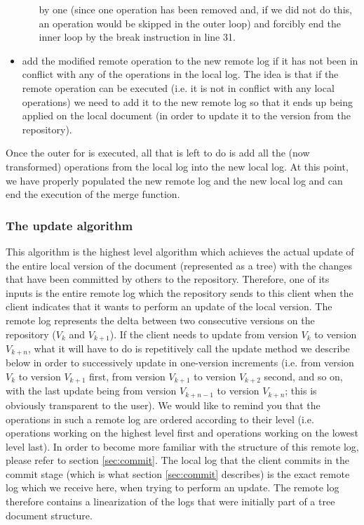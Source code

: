\begin{itemize}
\begin{enumerate}
      by one (since one operation has been removed and, if we did not do this, an operation would be
      skipped in the outer loop) and forcibly end the inner loop by the break instruction in line 31.
\end{enumerate}
\item add the modified remote operation to the new remote log if it has not been in conflict with any of
      the operations in the local log. The idea is that if the remote operation can be executed (i.e.
      it is not in conflict with any local operations) we need to add it to the new remote log so that
      it ends up being applied on the local document (in order to update it to the version from the
      repository).
\end{itemize}

Once the outer for is executed, all that is left to do is add all the (now transformed) operations
from the local log into the new local log. At this point, we have properly populated the new remote log
and the new local log and can end the execution of the merge function.

\subsubsection{The update algorithm}

This algorithm is the highest level algorithm which achieves the actual update of the entire local version
of the document (represented as a tree) with the changes that have been committed by others to the repository.
Therefore, one of its inputs is the entire remote log which the repository sends to this client when the
client indicates that it wants to perform an update of the local version. The remote log represents the
delta between two consecutive versions on the repository ($V_{k}$ and $V_{k+1}$). If the client needs to
update from version $V_{k}$ to version $V_{k+n}$, what it will have to do is repetitively call the update
method we describe below in order to successively update in one-version increments (i.e. from version $V_{k}$
to version $V_{k+1}$ first, from version $V_{k+1}$ to version $V_{k+2}$ second, and so on, with the last
update being from version $V_{k+n-1}$ to version $V_{k+n}$; this is obviously transparent to the user).
We would like to remind you that the operations
in such a remote log are ordered according to their level (i.e. operations working on the highest level first
and operations working on the lowest level last). In order to become more familiar with the structure of this
remote log, please refer to section \ref{sec:commit}. The local log that the client commits in the commit stage
(which is what section \ref{sec:commit} describes) is the exact remote log which we receive here, when trying
to perform an update. The remote log therefore contains a linearization of the logs that were initially part
of a tree document structure. 


